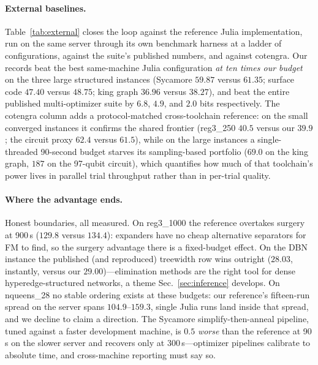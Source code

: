 \documentclass{SciPost}
\begin{document}
\paragraph{External baselines.}
Table~\ref{tab:external} closes the loop against the reference Julia
implementation, run on the same server through its own benchmark
harness at a ladder of configurations, against the suite's published
numbers, and against cotengra. Our records beat the best same-machine
Julia configuration \emph{at ten times our budget} on the three large
structured instances (Sycamore $59.87$ versus $61.35$; surface code
$47.40$ versus $48.75$; king graph $36.96$ versus $38.27$), and beat the
entire published multi-optimizer suite by $6.8$, $4.9$, and $2.0$ bits
respectively. The cotengra column adds a protocol-matched
cross-toolchain reference: on the small converged instances it confirms
the shared frontier (reg3\_250 $40.5$ versus our $39.9$; the circuit
proxy $62.4$ versus $61.5$), while on the large instances a
single-threaded 90-second budget starves its sampling-based portfolio
($69.0$ on the king graph, $187$ on the 97-qubit circuit), which
quantifies how much of that toolchain's power lives in parallel trial
throughput rather than in per-trial quality.

\paragraph{Where the advantage ends.}
Honest boundaries, all measured. On reg3\_1000 the reference overtakes
surgery at 900\,s ($129.8$ versus $134.4$): expanders have no cheap
alternative separators for FM to find, so the surgery advantage there is
a fixed-budget effect. On the DBN instance the published (and
reproduced) treewidth row wins outright ($28.03$, instantly, versus our
$29.00$)---elimination methods are the right tool for dense
hyperedge-structured networks, a theme Sec.~\ref{sec:inference}
develops. On nqueens\_28 no stable ordering exists at these budgets:
our reference's fifteen-run spread on the server spans $104.9$--$159.3$,
single Julia runs land inside that spread, and we decline to claim a
direction. The Sycamore simplify-then-anneal pipeline, tuned against a
faster development machine, is $0.5$ \emph{worse} than the reference at
90\,s on the slower server and recovers only at 300\,s---optimizer
pipelines calibrate to absolute time, and cross-machine reporting must
say so.
\end{document}
